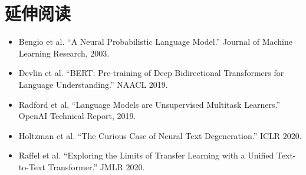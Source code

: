 \documentclass[UTF8,zihao=-4]{ctexart}
\begin{document}
\section*{延伸阅读}
\begin{itemize}
  \item Bengio et al. ``A Neural Probabilistic Language Model.'' Journal of Machine Learning Research, 2003.
  \item Devlin et al. ``BERT: Pre-training of Deep Bidirectional Transformers for Language Understanding.'' NAACL 2019.
  \item Radford et al. ``Language Models are Unsupervised Multitask Learners.'' OpenAI Technical Report, 2019.
  \item Holtzman et al. ``The Curious Case of Neural Text Degeneration.'' ICLR 2020.
  \item Raffel et al. ``Exploring the Limits of Transfer Learning with a Unified Text-to-Text Transformer.'' JMLR 2020.
\end{itemize}
\end{document}
